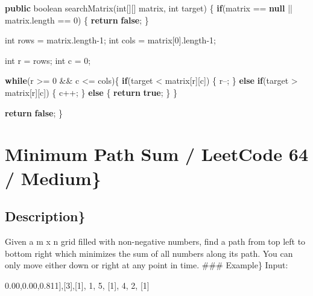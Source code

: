 \documentclass[]{book}
\newenvironment{Shaded}{\begin{snugshade}}{\end{snugshade}}
\newcommand{\DataTypeTok}[1]{\textcolor[rgb]{0.13,0.29,0.53}{#1}}
\newcommand{\DecValTok}[1]{\textcolor[rgb]{0.00,0.00,0.81}{#1}}
\newcommand{\FunctionTok}[1]{\textcolor[rgb]{0.00,0.00,0.00}{#1}}
\newcommand{\KeywordTok}[1]{\textcolor[rgb]{0.13,0.29,0.53}{\textbf{#1}}}
\newcommand{\NormalTok}[1]{#1}
\begin{document}
\begin{Shaded}
\begin{Highlighting}[]
\KeywordTok{public} \DataTypeTok{boolean} \FunctionTok{searchMatrix}\NormalTok{(}\DataTypeTok{int}\NormalTok{[][] matrix, }\DataTypeTok{int}\NormalTok{ target) \{}
    \KeywordTok{if}\NormalTok{(matrix == }\KeywordTok{null}\NormalTok{ || matrix.}\FunctionTok{length}\NormalTok{ == }\DecValTok{0}\NormalTok{) \{}
        \KeywordTok{return} \KeywordTok{false}\NormalTok{;}
\NormalTok{    \}}

    \DataTypeTok{int}\NormalTok{ rows = matrix.}\FunctionTok{length}\DecValTok{-1}\NormalTok{;}
    \DataTypeTok{int}\NormalTok{ cols = matrix[}\DecValTok{0}\NormalTok{].}\FunctionTok{length}\DecValTok{-1}\NormalTok{;}

    \DataTypeTok{int}\NormalTok{ r = rows;}
    \DataTypeTok{int}\NormalTok{ c = }\DecValTok{0}\NormalTok{;}

    \KeywordTok{while}\NormalTok{(r >= }\DecValTok{0}\NormalTok{ && c <= cols)\{}
        \KeywordTok{if}\NormalTok{(target < matrix[r][c]) \{}
\NormalTok{            r--;}
\NormalTok{        \} }\KeywordTok{else} \KeywordTok{if}\NormalTok{(target > matrix[r][c]) \{}
\NormalTok{            c++;}
\NormalTok{        \} }\KeywordTok{else}\NormalTok{ \{}
            \KeywordTok{return} \KeywordTok{true}\NormalTok{;}
\NormalTok{        \}}
\NormalTok{    \}}

    \KeywordTok{return} \KeywordTok{false}\NormalTok{;}
\NormalTok{\}}
\end{Highlighting}
\end{Shaded}

\hypertarget{minimum-path-sum-leetcode-64-medium}{%
\section{Minimum Path Sum / LeetCode 64 / Medium\}}\label{minimum-path-sum-leetcode-64-medium}}

\hypertarget{description-45}{%
\subsection{Description\}}\label{description-45}}

Given a m x n grid filled with non-negative numbers, find a path from top left to bottom right which minimizes the sum
of all numbers along its path. You can only move either down or right at any point in time.
\#\#\# Example\}
Input:

\begin{Shaded}
\begin{Highlighting}[]
\NormalTok{[}\DecValTok{1}\NormalTok{],[}\DecValTok{3}\NormalTok{],[}\DecValTok{1}\NormalTok{],}
 \DecValTok{1}\NormalTok{,  }\DecValTok{5}\NormalTok{, [}\DecValTok{1}\NormalTok{],}
 \DecValTok{4}\NormalTok{,  }\DecValTok{2}\NormalTok{, [}\DecValTok{1}\NormalTok{]}
\end{Highlighting}
\end{Shaded}
\end{document}
